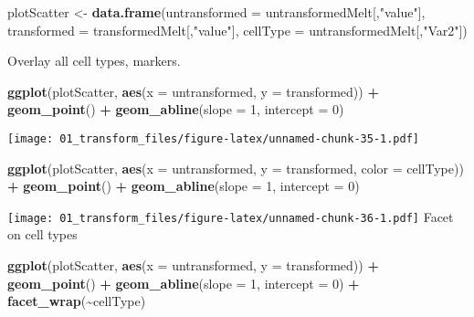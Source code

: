 \documentclass[
]{article}
\newenvironment{Shaded}{\begin{snugshade}}{\end{snugshade}}
\newcommand{\AttributeTok}[1]{\textcolor[rgb]{0.13,0.29,0.53}{#1}}
\newcommand{\DecValTok}[1]{\textcolor[rgb]{0.00,0.00,0.81}{#1}}
\newcommand{\FunctionTok}[1]{\textcolor[rgb]{0.13,0.29,0.53}{\textbf{#1}}}
\newcommand{\NormalTok}[1]{#1}
\newcommand{\OtherTok}[1]{\textcolor[rgb]{0.56,0.35,0.01}{#1}}
\newcommand{\SpecialCharTok}[1]{\textcolor[rgb]{0.81,0.36,0.00}{\textbf{#1}}}
\newcommand{\StringTok}[1]{\textcolor[rgb]{0.31,0.60,0.02}{#1}}
\begin{document}
\begin{Shaded}
\begin{Highlighting}[]
\NormalTok{plotScatter }\OtherTok{\textless{}{-}} \FunctionTok{data.frame}\NormalTok{(}\AttributeTok{untransformed =}\NormalTok{ untransformedMelt[,}\StringTok{"value"}\NormalTok{],}
                          \AttributeTok{transformed =}\NormalTok{ transformedMelt[,}\StringTok{"value"}\NormalTok{],}
                          \AttributeTok{cellType =}\NormalTok{ untransformedMelt[,}\StringTok{"Var2"}\NormalTok{])}
\end{Highlighting}
\end{Shaded}

Overlay all cell types, markers.

\begin{Shaded}
\begin{Highlighting}[]
\FunctionTok{ggplot}\NormalTok{(plotScatter, }\FunctionTok{aes}\NormalTok{(}\AttributeTok{x =}\NormalTok{ untransformed, }\AttributeTok{y =}\NormalTok{ transformed)) }\SpecialCharTok{+} \FunctionTok{geom\_point}\NormalTok{() }\SpecialCharTok{+} 
  \FunctionTok{geom\_abline}\NormalTok{(}\AttributeTok{slope =} \DecValTok{1}\NormalTok{, }\AttributeTok{intercept =} \DecValTok{0}\NormalTok{)}
\end{Highlighting}
\end{Shaded}

\texttt{[image: 01\_transform\_files/figure-latex/unnamed-chunk-35-1.pdf]}

\begin{Shaded}
\begin{Highlighting}[]
\FunctionTok{ggplot}\NormalTok{(plotScatter, }\FunctionTok{aes}\NormalTok{(}\AttributeTok{x =}\NormalTok{ untransformed, }\AttributeTok{y =}\NormalTok{ transformed, }\AttributeTok{color =}\NormalTok{ cellType)) }\SpecialCharTok{+} \FunctionTok{geom\_point}\NormalTok{() }\SpecialCharTok{+} 
  \FunctionTok{geom\_abline}\NormalTok{(}\AttributeTok{slope =} \DecValTok{1}\NormalTok{, }\AttributeTok{intercept =} \DecValTok{0}\NormalTok{)}
\end{Highlighting}
\end{Shaded}

\texttt{[image: 01\_transform\_files/figure-latex/unnamed-chunk-36-1.pdf]}
Facet on cell types

\begin{Shaded}
\begin{Highlighting}[]
\FunctionTok{ggplot}\NormalTok{(plotScatter, }\FunctionTok{aes}\NormalTok{(}\AttributeTok{x =}\NormalTok{ untransformed, }\AttributeTok{y =}\NormalTok{ transformed)) }\SpecialCharTok{+} \FunctionTok{geom\_point}\NormalTok{() }\SpecialCharTok{+} 
  \FunctionTok{geom\_abline}\NormalTok{(}\AttributeTok{slope =} \DecValTok{1}\NormalTok{, }\AttributeTok{intercept =} \DecValTok{0}\NormalTok{) }\SpecialCharTok{+} \FunctionTok{facet\_wrap}\NormalTok{(}\SpecialCharTok{\textasciitilde{}}\NormalTok{cellType)}
\end{Highlighting}
\end{Shaded}
\end{document}
